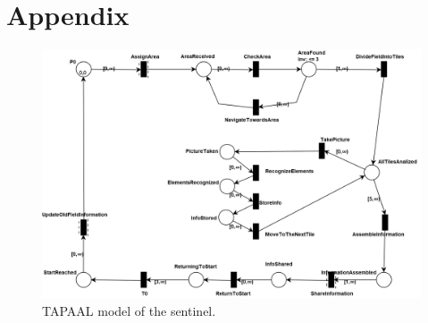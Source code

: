 \documentclass[english]{lni}
\begin{document}
\newpage

\newpage
\section{Appendix}\label{sec:appendix}
\begin{figure}[H]
    \centering
    \includegraphics[width = 12cm]{img/sentinel.png}
    \caption{TAPAAL model of the sentinel.}
    \label{fig:sentinel}
\end{figure}
\end{document}

